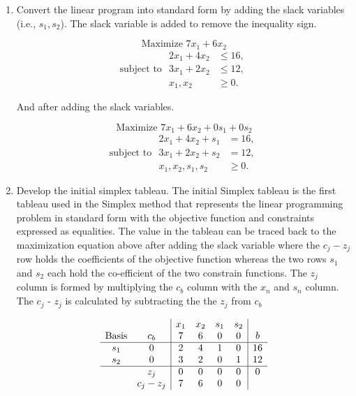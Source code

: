 \begin{enumerate}
    \item Convert the linear program into standard form by adding the slack variables (i.e., \(s_1, s_2\)). The slack variable is added to remove the inequality sign. 

    \[
    \text{Maximize } 7x_1 + 6x_2
    \]
    \[
    \text{subject to }
    \begin{aligned}
        2x_1 + 4x_2 &\leq 16, \\
        3x_1 + 2x_2 &\leq 12, \\
        x_1, x_2 &\geq 0.
    \end{aligned}
    \]

    And after adding the slack variables.
    
    \[
    \text{Maximize } 7x_1 + 6x_2 + 0s_1 + 0s_2
    \]
    \[
    \text{subject to }
    \begin{aligned}
        2x_1 + 4x_2 + s_1 &= 16, \\
        3x_1 + 2x_2 + s_2 &= 12, \\
        x_1, x_2, s_1, s_2 &\geq 0.
    \end{aligned}
    \]

    \item Develop the initial simplex tableau. The initial Simplex tableau is the first tableau used in the Simplex method that represents the linear programming problem in standard form with the objective function and constraints expressed as equalities. The value in the tableau can be traced back to the maximization equation above after adding the slack variable where the $c_j - z_j$ row holds the coefficients of the objective function whereas the two rows $s_1$ and $s_2$ each hold the co-efficient of the two constrain functions. The $z_j$ column is formed by multiplying the $c_b$ column with the $x_n$ and $s_n$ column. The $c_j$ - $z_j$ is calculated by subtracting the the $z_j$ from $c_b$

    \[
    \begin{array}{cc|cccc|c}
        & & x_1 & x_2 & s_1 & s_2 & \\
        \text{Basis} & c_b & 7  & 6 & 0 & 0 & b\\
        \hline
        s_1 & 0 &  2 & 4 & 1 & 0 & 16 \\
        s_2 & 0 &  3 & 2 & 0 & 1 & 12 \\
        \hline
        & z_j & 0 & 0 & 0 & 0 & 0 \\
        & c_j - z_j & 7 & 6 & 0 & 0  \\
    \end{array}
    \]


\end{enumerate}
